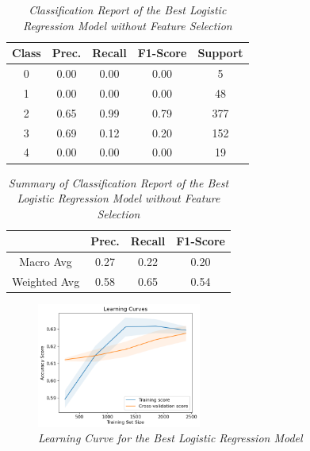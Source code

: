 \begin{table}[!ht]
    \begin{center}
        \begin{tabular}{c|c|c|c|c}			
            \hline
            Class & Prec. & Recall & F1-Score & Support \\
            \hline\hline
            0 & 0.00 & 0.00 & 0.00 & 5 \\
            1 & 0.00 & 0.00 & 0.00 & 48 \\
            2 & 0.65 & 0.99 & 0.79 & 377 \\
            3 & 0.69 & 0.12 & 0.20 & 152 \\
            4 & 0.00 & 0.00 & 0.00 & 19\\
            \hline
        \end{tabular}

        \caption{\textit{Classification Report of the Best Logistic Regression Model without Feature Selection}}
        \label{logr-report}

    \end{center}
\end{table}
\begin{table}[!ht]
    \begin{center}
        \begin{tabular}{c||c|c|c}			
            \hline
             & Prec. & Recall & F1-Score \\
             \hline\hline
            Macro Avg & 0.27 & 0.22 & 0.20 \\
            Weighted Avg & 0.58 & 0.65 & 0.54 \\
            \hline
        \end{tabular}

        \caption{\textit{Summary of Classification Report of the Best Logistic Regression Model without Feature Selection}}
        \label{logr-report-sum}

    \end{center}
\end{table}
\begin{figure}[!ht]
    \includegraphics[width = 0.48\textwidth]{res/logr-lc.png}
    \caption{\textit{Learning Curve for the Best Logistic Regression Model}}
    \label{fig:logr-lc}
\end{figure}
